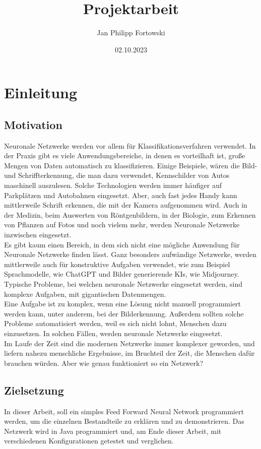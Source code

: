 \documentclass[12pt]{article}
\title{\textbf{Projektarbeit}}
\author{Jan Philipp Fortowski}
\date{02.10.2023}
\begin{document}
\maketitle
\cleardoublepage
\tableofcontents
\cleardoublepage
\thispagestyle{empty}

\section{Einleitung}
\subsection{Motivation}
Neuronale Netzwerke werden vor allem für Klassifikationsverfahren verwendet. In der Praxis gibt es viele Anwendungsbereiche, in denen es vorteilhaft ist, große Mengen von Daten automatisch zu klassifizieren. Einige Beispiele, wären die Bild- und Schriffterkennung, die man dazu verwendet, Kennschilder von Autos maschinell auszulesen. Solche Technologien werden immer häufiger auf Parkplätzen und Autobahnen eingesetzt. Aber, auch fast jedes Handy kann mittlerweile Schrift erkennen, die mit der Kamera aufgenommen wird. Auch in der Medizin, beim Auswerten von Röntgenbildern, in der Biologie, zum Erkennen von Pflanzen auf Fotos und noch vielem mehr, werden Neuronale Netzwerke inzwischen eingesetzt.\\
Es gibt kaum einen Bereich, in dem sich nicht eine mögliche Anwendung für Neuronale Netzwerke finden lässt. Ganz besonders aufwändige Netzwerke, werden mittlerweile auch für konstruktive Aufgaben verwendet, wie zum Beispiel Sprachmodelle, wie ChatGPT und Bilder generierende KIs, wie Midjourney.
Typische Probleme, bei welchen neuronale Netzwerke eingesetzt werden, sind komplexe Aufgaben, mit gigantischen Datenmengen.\\
Eine Aufgabe ist zu komplex, wenn eine Lösung nicht manuell programmiert werden kann, unter anderem, bei der Bilderkennung. Außerdem sollten solche Probleme automatisiert werden, weil es sich nicht lohnt, Menschen dazu einzusetzen. 
In solchen Fällen, werden neuronale Netzwerke eingesetzt.\\
Im Laufe der Zeit sind die modernen Netzwerke immer komplexer geworden, und liefern nahezu menschliche Ergebnisse, im Bruchteil der Zeit, die Menschen dafür brauchen würden. Aber wie genau funktioniert so ein Netzwerk?
\subsection{Zielsetzung}
In dieser Arbeit, soll ein simples Feed Forward Neural Network programmiert werden, um die einzelnen Bestandteile zu erklären und zu demonstrieren. Das Netzwerk wird in Java programmiert und, am Ende dieser Arbeit, mit verschiedenen Konfigurationen getestet und verglichen.
\end{document}
